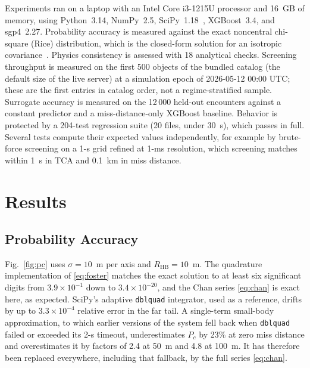 \documentclass[conference]{IEEEtran}
\newcommand{\Pc}{P_c}
\newcommand{\HBR}{R_{\mathrm{HB}}}
\begin{document}
Experiments ran on a laptop with an Intel Core i3-1215U processor and 16~GB of
memory, using Python~3.14, NumPy~2.5, SciPy~1.18~\cite{virtanen2020},
XGBoost~3.4, and sgp4~2.27. Probability accuracy is measured against the exact
noncentral chi-square (Rice) distribution, which is the closed-form solution for
an isotropic covariance~\cite{chan2008}. Physics consistency is assessed with 18
analytical checks. Screening throughput is measured on the first 500 objects of
the bundled catalog (the default size of the live server) at a simulation epoch
of 2026-05-12 00:00 UTC; these are the first entries in catalog order, not a
regime-stratified sample. Surrogate accuracy is measured on the 12\,000 held-out
encounters against a constant predictor and a miss-distance-only XGBoost
baseline. Behavior is protected by a 204-test regression suite (20 files, under
30~s), which passes in full. Several tests compute their expected values
independently, for example by brute-force screening on a 1-s grid refined at
1-ms resolution, which screening matches within 1~s in TCA and 0.1~km in miss
distance.

\section{Results}
\label{sec:results}

\subsection{Probability Accuracy}

Fig.~\ref{fig:pc} uses $\sigma=10$~m per axis and $\HBR=10$~m. The quadrature
implementation of \eqref{eq:foster} matches the exact solution to at least six
significant digits from $3.9\times10^{-1}$ down to $3.4\times10^{-20}$, and the
Chan series \eqref{eq:chan} is exact here, as expected. SciPy's adaptive
\texttt{dblquad} integrator, used as a reference, drifts by up to
$3.3\times10^{-4}$ relative error in the far tail. A single-term small-body
approximation, to which earlier versions of the system fell back when
\texttt{dblquad} failed or exceeded its 2-s timeout, underestimates $\Pc$ by
23\% at zero miss distance and overestimates it by factors of 2.4 at 50~m and
4.8 at 100~m. It has therefore been replaced everywhere, including that
fallback, by the full series \eqref{eq:chan}.
\end{document}
